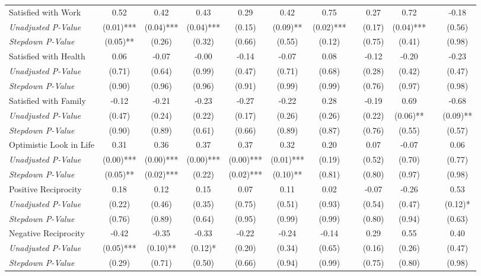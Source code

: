 \begin{tabular}{l c c c c c c c c c c c}
Satisfied with Work & 0.52 & 0.42 & 0.43 & 0.29 & 0.42 & 0.75 & & 0.27 & 0.72 & & -0.18 \\
\quad \textit{Unadjusted P-Value} & (0.01)*** & (0.04)*** & (0.04)*** & (0.15) & (0.09)** & (0.02)*** & & (0.17) & (0.04)*** & & (0.56) \\
\quad \textit{Stepdown P-Value} & (0.05)** & (0.26) & (0.32) & (0.66) & (0.55) & (0.12) & & (0.75) & (0.41) & & (0.98) \\
Satisfied with Health & 0.06 & -0.07 & -0.00 & -0.14 & -0.07 & 0.08 & & -0.12 & -0.20 & & -0.23 \\
\quad \textit{Unadjusted P-Value} & (0.71) & (0.64) & (0.99) & (0.47) & (0.71) & (0.68) & & (0.28) & (0.42) & & (0.47) \\
\quad \textit{Stepdown P-Value} & (0.90) & (0.96) & (0.96) & (0.91) & (0.99) & (0.99) & & (0.76) & (0.97) & & (0.98) \\
Satisfied with Family & -0.12 & -0.21 & -0.23 & -0.27 & -0.22 & 0.28 & & -0.19 & 0.69 & & -0.68 \\
\quad \textit{Unadjusted P-Value} & (0.47) & (0.24) & (0.22) & (0.17) & (0.26) & (0.26) & & (0.22) & (0.06)** & & (0.09)** \\
\quad \textit{Stepdown P-Value} & (0.90) & (0.89) & (0.61) & (0.66) & (0.89) & (0.87) & & (0.76) & (0.55) & & (0.57) \\
Optimistic Look in Life & 0.31 & 0.36 & 0.37 & 0.37 & 0.32 & 0.20 & & 0.07 & -0.07 & & 0.06 \\
\quad \textit{Unadjusted P-Value} & (0.00)*** & (0.00)*** & (0.00)*** & (0.00)*** & (0.01)*** & (0.19) & & (0.52) & (0.70) & & (0.77) \\
\quad \textit{Stepdown P-Value} & (0.05)** & (0.02)*** & (0.22) & (0.02)*** & (0.10)** & (0.81) & & (0.80) & (0.97) & & (0.98) \\
Positive Reciprocity & 0.18 & 0.12 & 0.15 & 0.07 & 0.11 & 0.02 & & -0.07 & -0.26 & & 0.53 \\
\quad \textit{Unadjusted P-Value} & (0.22) & (0.46) & (0.35) & (0.75) & (0.51) & (0.93) & & (0.54) & (0.47) & & (0.12)* \\
\quad \textit{Stepdown P-Value} & (0.76) & (0.89) & (0.64) & (0.95) & (0.99) & (0.99) & & (0.80) & (0.94) & & (0.63) \\
Negative Reciprocity & -0.42 & -0.35 & -0.33 & -0.22 & -0.24 & -0.14 & & 0.29 & 0.55 & & 0.40 \\
\quad \textit{Unadjusted P-Value} & (0.05)*** & (0.10)** & (0.12)* & (0.20) & (0.34) & (0.65) & & (0.16) & (0.26) & & (0.47) \\
\quad \textit{Stepdown P-Value} & (0.29) & (0.71) & (0.50) & (0.66) & (0.94) & (0.99) & & (0.75) & (0.80) & & (0.98) \\
\bottomrule
\end{tabular}
